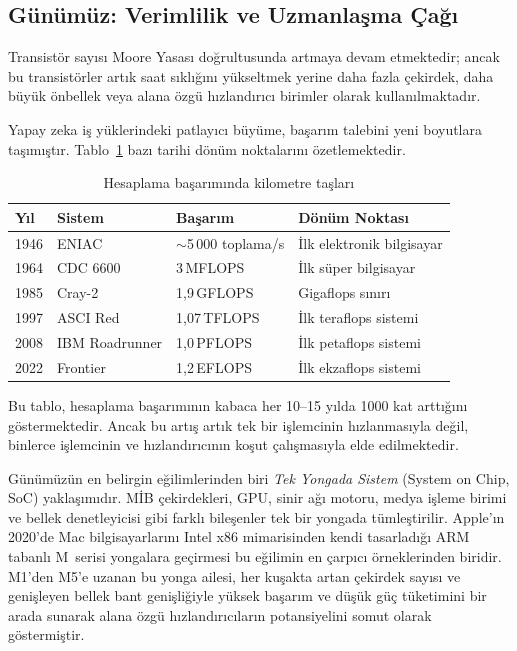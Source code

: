 \subsection{Günümüz: Verimlilik ve Uzmanlaşma Çağı}
\label{subsec:verimlilik-cagi}

Transistör sayısı Moore Yasası doğrultusunda artmaya devam etmektedir; ancak bu transistörler artık saat sıklığını yükseltmek yerine daha fazla çekirdek, daha büyük önbellek veya alana özgü hızlandırıcı birimler olarak kullanılmaktadır.

Yapay zeka iş yüklerindeki patlayıcı büyüme, başarım talebini yeni boyutlara taşımıştır. Tablo~\ref{tab:basarim-kilometre} bazı tarihi dönüm noktalarını özetlemektedir.

\begin{table}[H]
\centering
\caption{Hesaplama başarımında kilometre taşları}
\label{tab:basarim-kilometre}
\small
\begin{tabular}{llll}
\toprule
\textbf{Yıl} & \textbf{Sistem} & \textbf{Başarım} & \textbf{Dönüm Noktası} \\
\midrule
1946 & ENIAC           & $\sim$5\,000 toplama/s & İlk elektronik bilgisayar \\
1964 & CDC 6600        & 3\,MFLOPS         & İlk süper bilgisayar \\
1985 & Cray-2          & 1,9\,GFLOPS       & Gigaflops sınırı \\
1997 & ASCI Red        & 1,07\,TFLOPS      & İlk teraflops sistemi \\
2008 & IBM Roadrunner  & 1,0\,PFLOPS       & İlk petaflops sistemi \\
2022 & Frontier        & 1,2\,EFLOPS       & İlk ekzaflops sistemi \\
\bottomrule
\end{tabular}
\end{table}

Bu tablo, hesaplama başarımının kabaca her 10--15 yılda 1000 kat arttığını göstermektedir. Ancak bu artış artık tek bir işlemcinin hızlanmasıyla değil, binlerce işlemcinin ve hızlandırıcının koşut çalışmasıyla elde edilmektedir.

Günümüzün en belirgin eğilimlerinden biri \emph{Tek Yongada Sistem} (System on Chip, SoC) yaklaşımıdır. MİB çekirdekleri, GPU, sinir ağı motoru, medya işleme birimi ve bellek denetleyicisi gibi farklı bileşenler tek bir yongada tümleştirilir. Apple'ın 2020'de Mac bilgisayarlarını Intel x86 mimarisinden kendi tasarladığı ARM tabanlı M~serisi yongalara geçirmesi bu eğilimin en çarpıcı örneklerinden biridir. M1'den M5'e uzanan bu yonga ailesi, her kuşakta artan çekirdek sayısı ve genişleyen bellek bant genişliğiyle yüksek başarım ve düşük güç tüketimini bir arada sunarak alana özgü hızlandırıcıların potansiyelini somut olarak göstermiştir.

